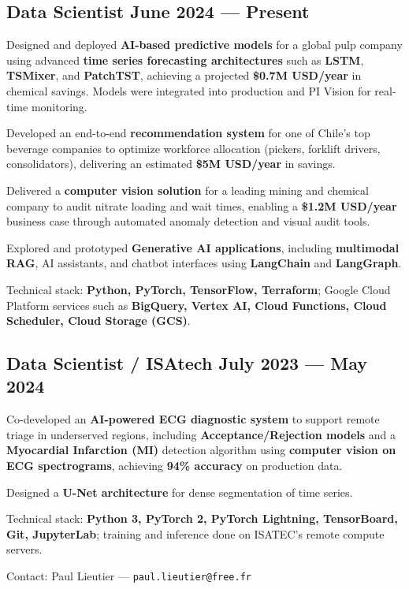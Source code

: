 \subsection{{Data Scientist \hfill June 2024 --- Present}}
\begin{zitemize}
\item Designed and deployed \textbf{AI-based predictive models} for a global pulp company using advanced \textbf{time series forecasting architectures} such as \textbf{LSTM}, \textbf{TSMixer}, and \textbf{PatchTST}, achieving a projected \textbf{\$0.7M USD/year} in chemical savings. Models were integrated into production and PI Vision for real-time monitoring.
\item Developed an end-to-end \textbf{recommendation system} for one of Chile’s top beverage companies to optimize workforce allocation (pickers, forklift drivers, consolidators), delivering an estimated \textbf{\$5M USD/year} in savings.
\item Delivered a \textbf{computer vision solution} for a leading mining and chemical company to audit nitrate loading and wait times, enabling a \textbf{\$1.2M USD/year} business case through automated anomaly detection and visual audit tools.
\item Explored and prototyped \textbf{Generative AI applications}, including \textbf{multimodal RAG}, AI assistants, and chatbot interfaces using \textbf{LangChain} and \textbf{LangGraph}.
\item Technical stack: \textbf{Python, PyTorch, TensorFlow, Terraform}; Google Cloud Platform services such as \textbf{BigQuery, Vertex AI, Cloud Functions, Cloud Scheduler, Cloud Storage (GCS)}.
\end{zitemize}

\subsection{{Data Scientist / ISAtech \hfill July 2023 --- May 2024}}
\begin{zitemize}
\item Co-developed an \textbf{AI-powered ECG diagnostic system} to support remote triage in underserved regions, including \textbf{Acceptance/Rejection models} and a \textbf{Myocardial Infarction (MI)} detection algorithm using \textbf{computer vision on ECG spectrograms}, achieving \textbf{94\% accuracy} on production data.
\item Designed a \textbf{U-Net architecture} for dense segmentation of time series.
\item Technical stack: \textbf{Python 3, PyTorch 2, PyTorch Lightning, TensorBoard, Git, JupyterLab}; training and inference done on ISATEC's remote compute servers.
\item Contact: Paul Lieutier --- \texttt{paul.lieutier@free.fr}
\end{zitemize}


